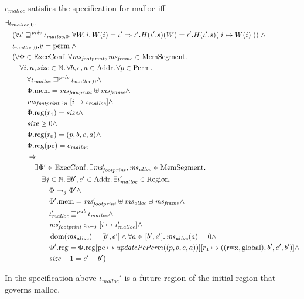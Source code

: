 \documentclass[a4paper]{article}
\newcommand{\update}[2]{[#1 \mapsto #2]}
\DeclareMathOperator{\dom}{dom}
\newcommand{\var}[1]{\mathit{#1}}
\newcommand{\hs}{\var{ms}}
\newcommand{\ms}{\hs}
\newcommand{\pcreg}{\mathrm{pc}}
\newcommand{\heap}{\var{mem}}
\newcommand{\plainproj}[1]{\mathrm{#1}}
\newcommand{\memheap}[1][\Phi]{#1.\plainproj{mem}}
\newcommand{\memreg}[1][\Phi]{#1.\plainproj{reg}}
\newcommand{\plainfun}[2]{
  \ifthenelse{\equal{#2}{}}
  {\mathit{#1}}
  {\mathit{#1}(#2)}
}
\newcommand{\updatePcPerm}[1]{\plainfun{updatePcPerm}{#1}}
\newcommand{\futurewk}{\mathbin{\sqsupseteq}^{\var{pub}}}
\newcommand{\futurestr}{\mathbin{\sqsupseteq}^{\var{priv}}}
\newcommand{\heapSat}[3][\heap]{#1 :_{#2} #3}
\newcommand{\codelabel}[1]{\mathit{#1}}
\newcommand{\malloc}{\codelabel{malloc}}
\newcommand{\plaindom}[1]{\mathrm{#1}}
\newcommand{\Addrs}{\plaindom{Addr}}
\newcommand{\ExecConfs}{\plaindom{ExecConf}}
\newcommand{\HeapSegments}{\plaindom{MemSegment}}
\newcommand{\nats}{\mathbb{N}}
\newcommand{\Perms}{\plaindom{Perm}}
\newcommand{\Regions}{\plaindom{Region}}
\newcommand{\plainperm}[1]{\mathrm{#1}}
\newcommand{\rwx}{\plainperm{rwx}}
\newcommand{\glob}{\plainperm{global}}
\newcommand{\plainview}[1]{\mathrm{#1}}
\newcommand{\perma}{\plainview{perm}}
\newcommand{\step}[1][]{\rightarrow_{#1}}
\begin{document}
\begin{specification}[Malloc v.2]
  $c_\malloc$ satisfies the specification for malloc iff
  \[  
    \begin{aligned}
      &\exists \iota_{\malloc,0} \ldotp \\
      &\quad (\forall \iota' \futurestr \iota_{\malloc,0} \ldotp \forall W,i \ldotp W(i)=\iota' \Rightarrow \iota'.H (\iota'.s) (W) = \iota'.H (\iota'.s) ([i \mapsto W(i)]) ) \; \land \\
      &\quad \iota_{\malloc,0}.v = \perma \; \land \\
      &\quad (\forall \Phi \in \ExecConfs \ldotp \forall \ms_{\var{footprint}}, \hsframe \in \HeapSegments \ldotp \\
      &\qquad \forall i, n, \size \in \nats \ldotp \forall b,e,a \in \Addrs\ldotp\forall p \in \Perms \ldotp \\
      &\qquad \quad \forall \iota_\malloc \futurestr \iota_{\malloc,0} \land \\
      &\qquad \quad \memheap = \ms_{\var{footprint}} \uplus \hsframe \land\\
      &\qquad \quad \heapSat[\ms_{\var{footprint}}]{n}{[i \mapsto \iota_\malloc]} \land \\
      &\qquad \quad \memreg(r_1) = \size \land \\
      &\qquad \quad \size \geq 0 \land \\
      &\qquad \quad \memreg(r_0) = (p,b,e,a) \land \\
      &\qquad \quad \memreg(\pcreg) = c_\malloc \\ %
      &\qquad \quad \Rightarrow \\
      &\qquad \qquad\exists \Phi' \in \ExecConfs \ldotp \exists \ms_{\var{footprint}}', \ms_{\var{alloc}} \in \HeapSegments\ldotp\\
      &\qquad \qquad \quad \exists j \in \nats \ldotp \exists b',e'\in \Addrs \ldotp \exists \iota_\malloc' \in \Regions \ldotp \\
      &\qquad \qquad \qquad \Phi \step[j] \Phi' \land \\
      &\qquad \qquad \qquad \memheap[\Phi']=\ms_{\var{footprint}}' \uplus \hs_{\var{alloc}} \uplus \hsframe \land\\
      &\qquad \qquad \qquad \iota_{\malloc}' \futurewk \iota_\malloc \land \\
      &\qquad \qquad \qquad \heapSat[\ms_{\var{footprint}}']{n-j}{[i \mapsto \iota_\malloc']} \land \\
      &\qquad \qquad \qquad \dom(\hs_{\var{alloc}}) = [b',e'] \land \forall a \in [b',e']\ldotp \hs_{\var{alloc}}(a) = 0  \land \\
      &\qquad \qquad \qquad \memreg[\Phi'] = \memreg[\Phi]\update{\pcreg}{\updatePcPerm{(p,b,e,a)}}\update{r_1}{((\rwx,\glob),b',e',b')} \land \\
      &\qquad \qquad \qquad \size - 1 = e'-b' )
    \end{aligned}
  \]
\end{specification}
In the specification above $\iota_\malloc'$ is a future region of the initial region that governs malloc.
\end{document}
